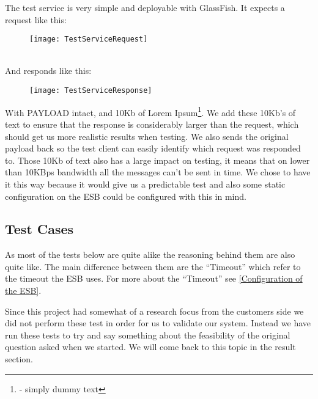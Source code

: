             The test service is very simple and deployable with GlassFish. It expects a request like this:
            \begin{figure}[h]
                \centering
                \texttt{[image: TestServiceRequest]}
                \label{fig:TestServiceRequest}
            \end{figure}
            \\
            And responds like this:
            \begin{figure}[h]
                \centering
                \texttt{[image: TestServiceResponse]}
                \label{fig:TestServiceResponse}
            \end{figure}
            With PAYLOAD intact, and 10Kb of Lorem Ipsum\footnote{ - simply dummy text}. We add these 10Kb's of text to ensure that the response is considerably larger than the request, which should get us more realistic results when testing. We also sends the original payload back so the test client can easily identify which request was responded to. Those 10Kb of text also has a large impact on testing, it means that on lower than 10KBps bandwidth all the messages can't be sent in time. We chose to have it this way because it would give us a predictable test and also some static configuration on the ESB could be configured with this in mind.

	\subsection{Test Cases}\label{Testing:Cases}
	As most of the tests below are quite alike the reasoning behind them are also quite like. The main difference between them are the “Timeout” which refer to the timeout the ESB uses. For more about the “Timeout” see \ref{Configuration of the ESB}.

	Since this project had somewhat of a research focus from the customers side we did not perform these test in order for us to validate our system. Instead we have run these tests to try and say something about the feasibility of the original question asked when we started. We will come back to this topic in the result section.

